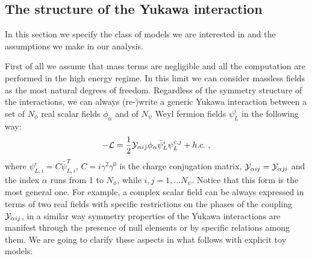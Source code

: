 \documentclass[a4paper,11pt]{article}
\newcommand{\be}{\begin{equation}}
\newcommand{\ee}{\end{equation}}
\begin{document}

\subsection{The structure of the Yukawa interaction}\label{sec:gen}
In this section we specify the class of models we are interested in and the assumptions we make in our analysis. 

First of all we assume that mass terms are negligible and all the computation are performed in the high energy regime. 
In this limit we can consider massless fields as the most natural degrees of freedom. Regardless of the symmetry structure of the interactions, we can always (re-)write a generic Yukawa interaction between a set of $N_\phi$ real scalar fields $\phi_\alpha$ and of $N_\psi$ Weyl fermion fields $\psi_{L}^i$ in the following way:
\be\label{eq:gen_lag}
- {\cal L} = \frac{1}{2} {\cal Y}_{\alpha i j} 
\phi_\alpha \bar \psi_L^i   \psi_L^{c,j} + h.c. \ ,
\ee
where $\psi^c_{L,i}=C \bar \psi^T_{L,i}$,  $C=i \gamma^2 \gamma^0$ is the charge conjugation matrix, ${\cal Y}_{\alpha ij}={\cal Y}_{\alpha ji}$ and the index $\alpha$ runs from 1 to $N_\phi$, while $i,j = 1,\ldots N_\psi$. 
Notice that this form is the most general one. For example, a complex scalar field can be always expressed in terms of two real fields with specific restrictions on the phases of the coupling  ${\cal Y}_{\alpha ij}$, in a similar way symmetry properties of the Yukawa interactions are manifest through the presence of null elements or by specific relations among them. We are going to clarify these aspects in what follows with explicit toy models.
\end{document}
